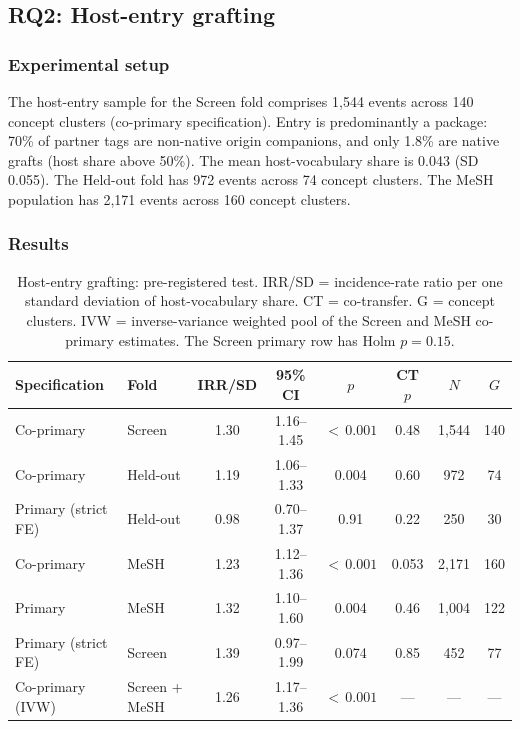 \documentclass[11pt,letterpaper]{article}
\begin{document}
\subsection{RQ2: Host-entry grafting}
\label{sec:rq2}

\subsubsection{Experimental setup}
\label{sec:rq2_setup}

The host-entry sample for the Screen fold comprises 1,544 events across 140 concept clusters (co-primary
specification). Entry is predominantly a package: 70\% of partner tags are non-native origin companions, and
only 1.8\% are native grafts (host share above 50\%). The mean host-vocabulary share is 0.043 (SD 0.055). The
Held-out fold has 972 events across 74 concept clusters. The MeSH population has 2,171 events across 160
concept clusters.

\subsubsection{Results}
\label{sec:rq2_results}

\begin{table}[!htbp]
\centering
\caption{Host-entry grafting: pre-registered test. IRR/SD = incidence-rate ratio per one standard deviation
of host-vocabulary share. CT = co-transfer. G = concept clusters. IVW = inverse-variance weighted pool of the Screen and MeSH
co-primary estimates. The Screen primary row has Holm $p = 0.15$.}
\label{tab:grafting}
\small
\begin{tabularx}{\linewidth}{l l c c c c c c}
\toprule
Specification & Fold & IRR/SD & 95\% CI & $p$ & CT $p$ & $N$ & $G$ \\
\midrule
Co-primary & Screen & 1.30 & 1.16--1.45 & ${<}\,0.001$ & 0.48 & 1,544 & 140 \\
Co-primary & Held-out & 1.19 & 1.06--1.33 & 0.004 & 0.60 & 972 & 74 \\
Primary (strict FE) & Held-out & 0.98 & 0.70--1.37 & 0.91 & 0.22 & 250 & 30 \\
Co-primary & MeSH & 1.23 & 1.12--1.36 & ${<}\,0.001$ & 0.053 & 2,171 & 160 \\
Primary & MeSH & 1.32 & 1.10--1.60 & 0.004 & 0.46 & 1,004 & 122 \\
Primary (strict FE) & Screen & 1.39 & 0.97--1.99 & 0.074 & 0.85 & 452 & 77 \\
Co-primary (IVW) & Screen + MeSH & 1.26 & 1.17--1.36 & ${<}\,0.001$ & --- & --- & --- \\
\bottomrule
\end{tabularx}
\end{table}
\end{document}
